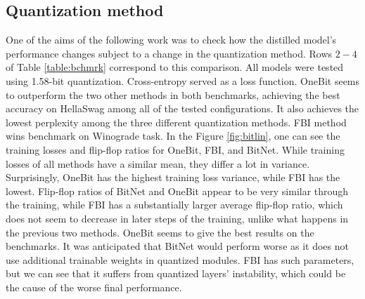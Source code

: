 \documentclass{article}
\begin{document}
\subsection{Quantization method}
One of the aims of the following work was to check how the distilled model's performance changes subject to a change in the quantization method. Rows \(2-4\) of Table \ref{table:bchmrk} correspond to this comparison. All models were tested using 1.58-bit quantization. Cross-entropy served as a loss function. OneBit seems to outperform the two other methods in both benchmarks, achieving the best accuracy on HellaSwag among all of the tested configurations. It also achieves the lowest perplexity among the three different quantization methods. FBI method wins benchmark on Winograde task. In the Figure \ref{fig:bitlin}, one can see the training losses and flip-flop ratios for OneBit, FBI, and BitNet. While training losses of all methods have a similar mean, they differ a lot in variance. Surprisingly, OneBit has the highest training loss variance, while FBI has the lowest. Flip-flop ratios of BitNet and OneBit appear to be very similar through the training, while FBI has a substantially larger average flip-flop ratio, which does not seem to decrease in later steps of the training, unlike what happens in the previous two methods. OneBit seems to give the best results on the benchmarks. It was anticipated that BitNet would perform worse as it does not use additional trainable weights in quantized modules. FBI has such parameters, but we can see that it suffers from quantized layers' instability, which could be the cause of the worse final performance.
\end{document}
